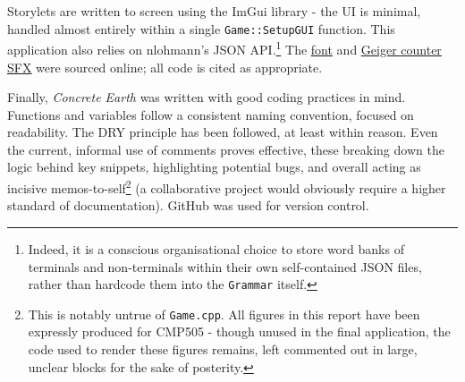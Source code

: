 \documentclass[a4paper, 11pt]{article}
\begin{document}
\begin{flushleft}
\vspace{5pt}\noindent
Storylets are written to screen using the ImGui library - the UI is minimal, handled almost entirely within a single \texttt{Game::SetupGUI} function. This application also relies on nlohmann's JSON API.\footnote{Indeed, it is a conscious organisational choice to store word banks of terminals and non-terminals within their own self-contained JSON files, rather than hardcode them into the \texttt{Grammar} itself.} The \href{https://www.dafont.com/benegraphic.font}{\ul{font}} and \href{https://freesound.org/people/JustLaz/sounds/616516/}{\ul{Geiger counter SFX}} were sourced online; all code is cited as appropriate.

\vspace{5pt}\noindent
Finally, \textit{Concrete Earth} was written with good coding practices in mind. Functions and variables follow a consistent naming convention, focused on readability. The DRY principle has been followed, at least within reason. Even the current, informal use of comments proves effective, these breaking down the logic behind key snippets, highlighting potential bugs, and overall acting as incisive memos-to-self\footnote{This is notably untrue of \texttt{Game.cpp}. All figures in this report have been expressly produced for CMP505 - though unused in the final application, the code used to render these figures remains, left commented out in large, unclear blocks for the sake of posterity.} (a collaborative project would obviously require a higher standard of documentation). GitHub was used for version control.


\end{flushleft}
\end{document}
